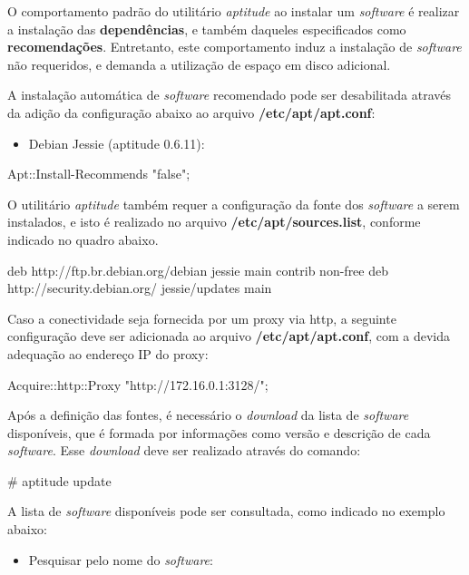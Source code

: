     O comportamento padrão do utilitário {\it aptitude} ao instalar um
{\it software} é realizar a instalação das {\bf dependências}, e também
daqueles especificados como {\bf recomendações}. Entretanto, este
comportamento induz a instalação de {\it software} não requeridos, e
demanda a utilização de espaço em disco adicional.

    A instalação automática de {\it software} recomendado pode ser
desabilitada através da adição da configuração abaixo ao arquivo
{\bf /etc/apt/apt.conf}:


\begin{itemize}
\item{\bf }Debian Jessie (aptitude 0.6.11):
\end{itemize}

\begin{BoxVerbatim}
Apt::Install-Recommends "false";
\end{BoxVerbatim}

    O utilitário {\it aptitude} também requer a configuração da fonte dos
{\it software} a serem instalados, e isto é realizado no arquivo
{\bf /etc/apt/sources.list}, conforme indicado no quadro abaixo.

\begin{BoxVerbatim}
deb http://ftp.br.debian.org/debian jessie main contrib non-free
deb http://security.debian.org/ jessie/updates main
\end{BoxVerbatim}

    Caso a conectividade seja fornecida por um proxy via http, a seguinte
configuração deve ser adicionada ao arquivo {\bf /etc/apt/apt.conf}, com a
devida adequação ao endereço IP do proxy:

\begin{BoxVerbatim}
Acquire::http::Proxy "http://172.16.0.1:3128/";
\end{BoxVerbatim}

    Após a definição das fontes, é necessário o {\it download} da lista de
{\it software} disponíveis, que é formada por informações como versão e descrição de
cada {\it software}. Esse {\it download} deve ser realizado através do comando:

\begin{BoxVerbatim}
    # aptitude update
\end{BoxVerbatim}

    A lista de {\it software} disponíveis pode ser consultada, como indicado
no exemplo abaixo:

\begin{itemize}
\item{\bf }Pesquisar pelo nome do {\it software}:
\end{itemize}

